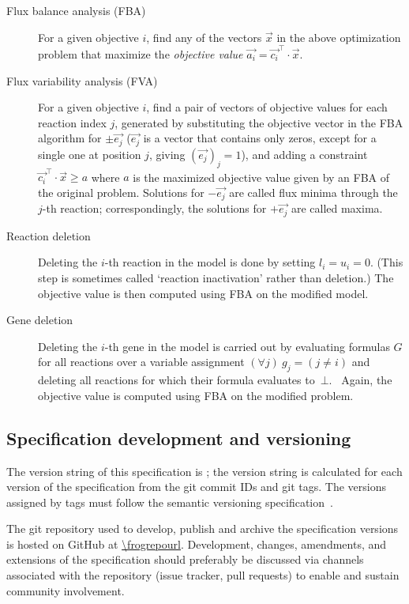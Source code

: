 \begin{description}
\item[Flux balance analysis (FBA)] For a given objective $i$, find any of the vectors $\vec{x}$ in the above optimization problem that maximize the \emph{objective value} $\vec{a_i} = \vec{c_i}^\intercal \cdot \vec{x}$.

\item[Flux variability analysis (FVA)] For a given objective $i$, find a pair of vectors of objective values for each reaction index $j$, generated by substituting the objective vector in the FBA algorithm for $\pm \vec{e_j}$ ($\vec{e_j}$ is a vector that contains only zeros, except for a single one at position $j$, giving $(\vec{e_j})_j = 1$), and adding a constraint $\vec{c_i}^\intercal\cdot \vec{x} \geq a$ where $a$ is the maximized objective value given by an FBA of the original problem.
Solutions for $-\vec{e_j}$ are called flux minima through the $j$-th reaction; correspondingly, the solutions for $+\vec{e_j}$ are called maxima.

\item[Reaction deletion] Deleting the $i$-th reaction in the model is done by setting $l_i = u_i = 0$. (This step is sometimes called `reaction inactivation' rather than deletion.)
The objective value is then computed using FBA on the modified model.

\item[Gene deletion] Deleting the $i$-th gene in the model is carried out by evaluating formulas $G$ for all reactions over a variable assignment $(\forall j)\ g_j = (j \neq i)$ and deleting all reactions for which their formula evaluates to~$\bot$.~\cite{palsson2015systems}
Again, the objective value is computed using FBA on the modified problem.
\end{description}

\subsection{Specification development and versioning}

The version string of this specification is \texttt{\frogspecversion}; the version string is calculated for each version of the specification from the git commit IDs and git tags.
The versions assigned by tags must follow the semantic versioning specification~\cite{semver}.

The git repository used to develop, publish and archive the specification versions is hosted on GitHub at \url{\frogrepourl}.
Development, changes, amendments, and extensions of the specification should preferably be discussed via channels associated with the repository (issue tracker, pull requests) to enable and sustain community involvement.

